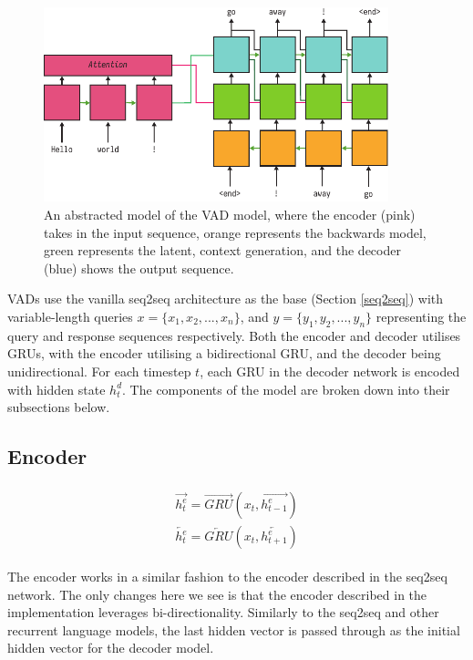 \documentclass[12pt,twoside]{report}
\begin{document}
\begin{figure}[!ht]
		
	\centering
	\includegraphics[width=100mm]{diagrams/vad.pdf}
	\caption{An abstracted model of the VAD model, where the encoder (pink) takes in the input sequence, orange represents the backwards model, green represents the latent, context generation, and the decoder (blue) shows the output sequence.\label{vad_abstract}}
	\end{figure}

VADs use the vanilla seq2seq architecture as the base (Section \ref{seq2seq}) with variable-length queries $x = \{x_1, x_2, ..., x_n\}$, and $y = \{y_1, y_2, ..., y_n\}$ representing the query and response sequences respectively. Both the encoder and decoder utilises GRUs, with the encoder utilising a bidirectional GRU, and the decoder being unidirectional. For each timestep $t$, each GRU in the decoder network is encoded with hidden state $h^d_t$. The components of the model are broken down into their subsections below.


\subsection{Encoder}

\begin{align}
\label{eqn:eqlabel}
\begin{split}
	\overrightarrow{h^e_t} = \overrightarrow{GRU}(x_t, \overrightarrow{h^e_{t-1}})
\\
\overleftarrow{h^e_t} = \overleftarrow{GRU}(x_t, \overleftarrow{h^e_{t+1}})
\end{split}
\end{align}

The encoder works in a similar fashion to the encoder described in the seq2seq network. The only changes here we see is that the encoder described in the implementation leverages bi-directionality. Similarly to the seq2seq and other recurrent language models, the last hidden vector is passed through as the initial hidden vector for the decoder model.
\end{document}
